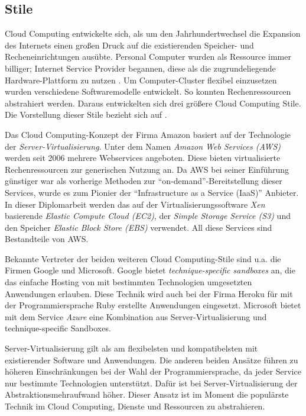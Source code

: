 \subsection{Stile}

Cloud Computing entwickelte sich, als um den Jahrhundertwechsel die Expansion des Internets einen großen Druck auf die existierenden Speicher- und Recheneinrichtungen ausübte. Personal Computer wurden als Ressource immer billiger; Internet Service Provider begannen, diese als die zugrundeliegende Hardware-Plattform zu nutzen . Um Computer-Cluster flexibel einzusetzen wurden verschiedene Softwaremodelle entwickelt. So konnten Rechenressourcen abstrahiert werden. Daraus entwickelten sich drei größere Cloud Computing Stile. Die Vorstellung dieser Stile bezieht sich auf . 

Das Cloud Computing-Konzept der Firma Amazon basiert auf der Technologie der \textit{Server-Virtualisierung}. Unter dem Namen \textit{Amazon Web Services (AWS)} werden seit 2006 mehrere Webservices angeboten. Diese bieten virtualisierte Rechenressourcen zur generischen Nutzung an. Da AWS bei seiner Einführung günstiger war als vorherige Methoden zur \enquote{on-demand}-Bereitstellung dieser Services, wurde es zum Pionier der \enquote{Infrastructure as a Service (IaaS)} Anbieter. In dieser Diplomarbeit werden das auf der Virtualisierungssoftware \textit{Xen} basierende \textit{Elastic Compute Cloud (EC2)}, der \textit{Simple Storage Service (S3)} und den Speicher \textit{Elastic Block Store (EBS)} verwendet. All diese Services sind Bestandteile von AWS.

Bekannte Vertreter der beiden weiteren Cloud Computing-Stile sind u.a. die Firmen Google und Microsoft. Google bietet \textit{technique-specific sandboxes} an, die das einfache Hosting von mit bestimmten Technologien umgesetzten Anwendungen erlauben. Diese Technik wird auch bei der Firma Heroku für mit der Programmiersprache Ruby erstellte Anwendungen eingesetzt. Microsoft bietet mit dem Service \textit{Azure} eine Kombination aus Server-Virtualisierung und technique-specific Sandboxes.

Server-Virtualisierung gilt als am flexibelsten und kompatibelsten mit existierender Software und Anwendungen. Die anderen beiden Ansätze führen zu höheren Einschränkungen bei der Wahl der Programmiersprache, da jeder Service nur bestimmte Technologien unterstützt. Dafür ist bei Server-Virtualisierung der Abstraktionsmehraufwand höher. Dieser Ansatz ist im Moment die populärste Technik im Cloud Computing, Dienste und Ressourcen zu abstrahieren.

